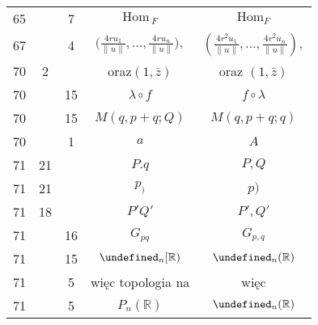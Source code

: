 \documentclass[a4paper,11pt]{article}
\newcommand{\fr}{\frac}
\newcommand{\mb}{\mathbb}
\newcommand{\mc}{\mathcal}
\newcommand{\mr}{\mathrm}
\newcommand{\ld}{\ldots}
\newcommand{\Hom}{\mr{Hom}}
\newcommand{\la}{\lambda}
\newcommand{\R}{\mb{R}}
\let\P\undefined
\newcommand{\P}{\mc{P}}
\providecommand{\norm}[1]{\lVert #1 \rVert}
\begin{document}
\begin{center}
\begin{tabular}{|c|c|c|c|c|}
    65 & & 7 & $\Hom_{ \: F }$ & $\Hom_{ F }$ \\
    67 & & 4 & $\big( \fr{ 4 r u_{ 1 } }{ \norm{ u } }, \ld,
               \fr{ 4 r u_{ n } }{ \norm{ u } } \big),$
           & $\left( \fr{ 4 r^{ 2 } u_{ 1 } }{ \norm{ u } }, \ld,
             \fr{ 4 r^{ 2 } u_{ n } }{ \norm{ u } } \right)\! ,$ \\
    70 & 2 & & oraz$( 1, \bar{ z } )$ & oraz $( 1, \bar{ z } )$ \\
    70 & & 15 & $\la \circ f$ & $f \circ \la$ \\
    70 & & 15 & $M( q, p + q; Q)$ & $M( q, p + q; q)$ \\
    70 & &  1 & $a$ & $A$ \\
    71 & 21 & & $P.q$ & $P, Q$ \\
    71 & 21 & & $p_{ ) }$ & $p )$ \\
    71 & 18 & & $P' Q'$ & $P', Q'$ \\
    71 & & 16 & $G_{ pq }$ & $G_{ p, q }$ \\
    71 & & 15 & $\P_{ n }[ \R )$ & $\P_{ n }( \R )$ \\
    71 & &  5 & więc topologia na & więc \\
    71 & &  5 & $P_{ n }( \R )$ & $\P_{ n }( \R )$ \\ \hline
  \end{tabular}


\end{center}
\end{document}
